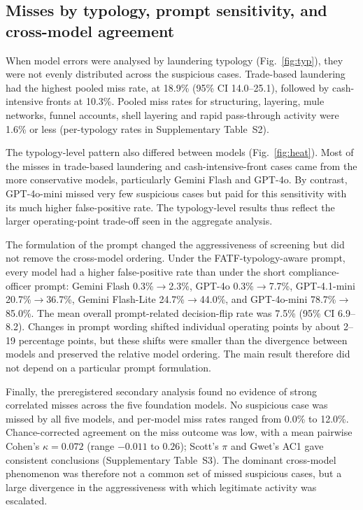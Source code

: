\documentclass[pdflatex,sn-basic,Numbered]{sn-jnl}
\begin{document}
\subsection{Misses by typology, prompt sensitivity, and cross-model agreement}\label{sec:typology}

When model errors were analysed by laundering typology (Fig.~\ref{fig:typ}), they were not evenly distributed across the suspicious cases. Trade-based laundering had the highest pooled miss rate, at 18.9\% (95\% CI 14.0--25.1), followed by cash-intensive fronts at 10.3\%. Pooled miss rates for structuring, layering, mule networks, funnel accounts, shell layering and rapid pass-through activity were 1.6\% or less (per-typology rates in Supplementary Table~S2).

The typology-level pattern also differed between models (Fig.~\ref{fig:heat}). Most of the misses in trade-based laundering and cash-intensive-front cases came from the more conservative models, particularly Gemini Flash and GPT-4o. By contrast, GPT-4o-mini missed very few suspicious cases but paid for this sensitivity with its much higher false-positive rate. The typology-level results thus reflect the larger operating-point trade-off seen in the aggregate analysis.

The formulation of the prompt changed the aggressiveness of screening but did not remove the cross-model ordering. Under the FATF-typology-aware prompt, every model had a higher false-positive rate than under the short compliance-officer prompt: Gemini Flash 0.3\%$\rightarrow$2.3\%, GPT-4o 0.3\%$\rightarrow$7.7\%, GPT-4.1-mini 20.7\%$\rightarrow$36.7\%, Gemini Flash-Lite 24.7\%$\rightarrow$44.0\%, and GPT-4o-mini 78.7\%$\rightarrow$85.0\%. The mean overall prompt-related decision-flip rate was 7.5\% (95\% CI 6.9--8.2). Changes in prompt wording shifted individual operating points by about 2--19 percentage points, but these shifts were smaller than the divergence between models and preserved the relative model ordering. The main result therefore did not depend on a particular prompt formulation.

Finally, the preregistered secondary analysis found no evidence of strong correlated misses across the five foundation models. No suspicious case was missed by all five models, and per-model miss rates ranged from 0.0\% to 12.0\%. Chance-corrected agreement on the miss outcome was low, with a mean pairwise Cohen's $\kappa = 0.072$ (range $-0.011$ to $0.26$); Scott's $\pi$ and Gwet's AC1 gave consistent conclusions (Supplementary Table~S3). The dominant cross-model phenomenon was therefore not a common set of missed suspicious cases, but a large divergence in the aggressiveness with which legitimate activity was escalated.
\end{document}
